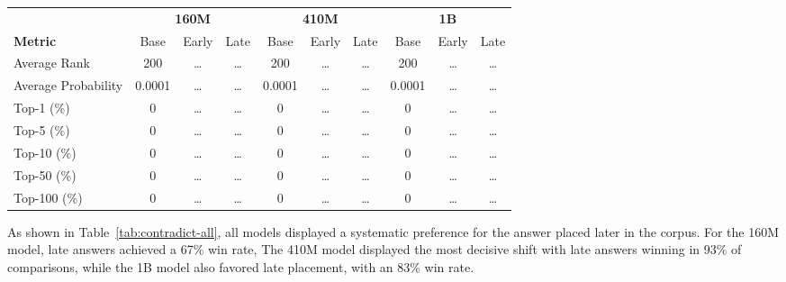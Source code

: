 \documentclass[11pt]{article}
\begin{document}
    \begin{table*}[htbp]
        \centering
        \small
        \begin{tabular}{l|ccc|ccc|ccc}
            \hline
            & \multicolumn{3}{c|}{\textbf{160M}} & \multicolumn{3}{c|}{\textbf{410M}} & \multicolumn{3}{c}{\textbf{1B}} \\
            \textbf{Metric} & Base & Early & Late & Base & Early & Late & Base & Early & Late  \\
            \hline
            Average Rank        & 200    & \dots & \dots & 200    & \dots & \dots & 200    & \dots & \dots \\
            Average Probability & 0.0001 & \dots & \dots & 0.0001 & \dots & \dots & 0.0001 & \dots & \dots \\
            Top-1 (\%)          & 0      & \dots & \dots & 0      & \dots & \dots & 0      & \dots & \dots \\
            Top-5 (\%)          & 0      & \dots & \dots & 0      & \dots & \dots & 0      & \dots & \dots \\
            Top-10 (\%)         & 0      & \dots & \dots & 0      & \dots & \dots & 0      & \dots & \dots \\
            Top-50 (\%)         & 0      & \dots & \dots & 0      & \dots & \dots & 0      & \dots & \dots \\
            Top-100 (\%)        & 0      & \dots & \dots & 0      & \dots & \dots & 0      & \dots & \dots \\
            \hline
        \end{tabular}
        \caption{Experiment 2: Contradictory facts across all three model sizes.
        Base = pretrained model, Early Ans.\ = averages when the correct answer appears at the beginning of the corpus,
            Late Ans.\ = averages when the correct answer appears at the end.}
        \label{tab:contradict-all}
    \end{table*}



    As shown in Table~\ref{tab:contradict-all}, all models displayed a systematic preference for the answer placed later in the corpus. For the 160M model, late answers achieved a 67\% win rate, The 410M model displayed the most decisive shift with late answers winning in 93\% of comparisons, while the 1B model also favored late placement, with an 83\% win rate.
\end{document}
